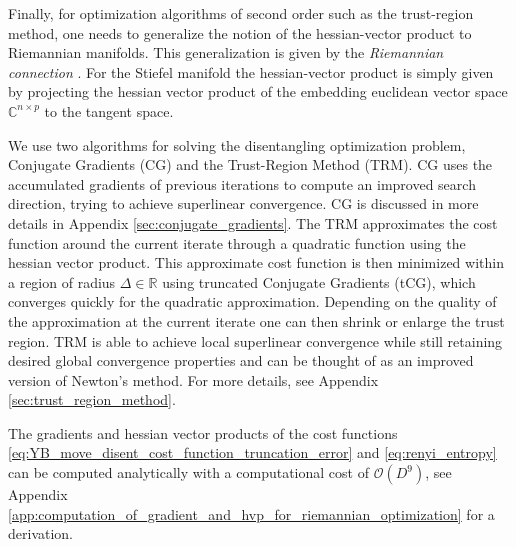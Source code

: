 Finally, for optimization algorithms of second order such as the trust-region method, one needs to generalize the notion of the hessian-vector product to Riemannian manifolds. This generalization is given by the \textit{Riemannian connection} \cite{cite:optimization_on_matrix_manifolds}. For the Stiefel manifold the hessian-vector product is simply given by projecting the hessian vector product of the embedding euclidean vector space $\mathbb{C}^{n\times p}$ to the tangent space. \par
We use two algorithms for solving the disentangling optimization problem, Conjugate Gradients (CG) and the Trust-Region Method (TRM). CG uses the accumulated gradients of previous iterations to compute an improved search direction, trying to achieve superlinear convergence. CG is discussed in more details in Appendix \ref{sec:conjugate_gradients}. The TRM approximates the cost function around the current iterate through a quadratic function using the hessian vector product. This approximate cost function is then minimized within a region of radius $\Delta\in\mathbb{R}$ using truncated Conjugate Gradients (tCG), which converges quickly for the quadratic approximation. Depending on the quality of the approximation at the current iterate one can then shrink or enlarge the trust region. TRM is able to achieve local superlinear convergence while still retaining desired global convergence properties \cite{cite:optimization_on_matrix_manifolds} and can be thought of as an improved version of Newton's method. For more details, see Appendix \ref{sec:trust_region_method}. \par
The gradients and hessian vector products of the cost functions \eqref{eq:YB_move_disent_cost_function_truncation_error} and \eqref{eq:renyi_entropy} can be computed analytically with a computational cost of $\mathcal{O}(D^9)$, see Appendix \ref{app:computation_of_gradient_and_hvp_for_riemannian_optimization} for a derivation.
